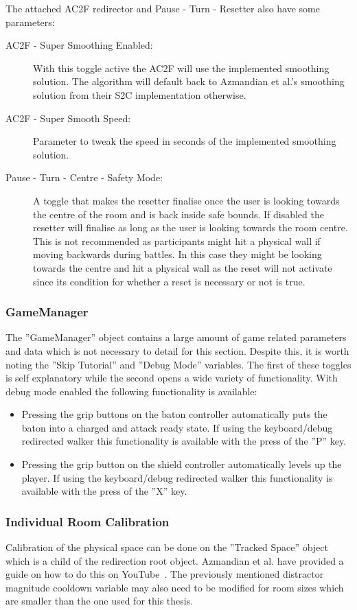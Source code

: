 The attached AC2F redirector and Pause - Turn - Resetter also have some parameters:
\begin{description}
   \item[AC2F - Super Smoothing Enabled:] With this toggle active the AC2F will use the implemented smoothing solution. The algorithm will default back to Azmandian et al.'s smoothing solution from their S2C implementation otherwise. 
   \item[AC2F - Super Smooth Speed:] Parameter to tweak the speed in seconds of the implemented smoothing solution.
   \item[Pause - Turn - Centre - Safety Mode:] A toggle that makes the resetter finalise once the user is looking towards the centre of the room and is back inside safe bounds. If disabled the resetter will finalise as long as the user is looking towards the room centre. This is not recommended as participants might hit a physical wall if moving backwards during battles. In this case they might be looking towards the centre and hit a physical wall as the reset will not activate since its condition for whether a reset is necessary or not is true. 
\end{description}

\subsubsection{GameManager}
The ''GameManager'' object contains a large amount of game related parameters and data which is not necessary to detail for this section. Despite this, it is worth noting the ''Skip Tutorial'' and ''Debug Mode'' variables. The first of these toggles is self explanatory while the second opens a wide variety of functionality. With debug mode enabled the following functionality is available:

\begin{itemize}
    \item Pressing the grip buttons on the baton controller automatically puts the baton into a charged and attack ready state. If using the keyboard/debug redirected walker this functionality is available with the press of the ''P'' key.
    \item Pressing the grip button on the shield controller automatically levels up the player. If using the keyboard/debug redirected walker this functionality is available with the press of the ''X'' key.
\end{itemize}

\subsubsection{Individual Room Calibration}
Calibration of the physical space can be done on the ''Tracked Space'' object which is a child of the redirection root object. Azmandian et al. have provided a guide on how to do this on YouTube~\cite{toolkitSetup}. The previously mentioned distractor magnitude cooldown variable may also need to be modified for room sizes which are smaller than the one used for this thesis. 

